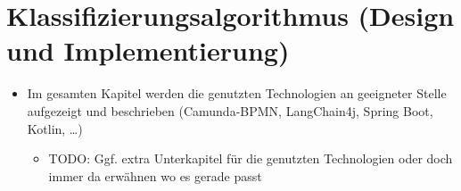 \chapter{Klassifizierungsalgorithmus (Design und Implementierung)}\label{ch:klassifizierungsalgorithmus-(design-und-implementierung)}

\begin{itemize}
    \item Im gesamten Kapitel werden die genutzten Technologien an geeigneter Stelle aufgezeigt und beschrieben (Camunda-BPMN, LangChain4j, Spring Boot, Kotlin, \ldots)
    \begin{itemize}
        \item TODO: Ggf. extra Unterkapitel für die genutzten Technologien oder doch immer da erwähnen wo es gerade passt
    \end{itemize}
\end{itemize}








